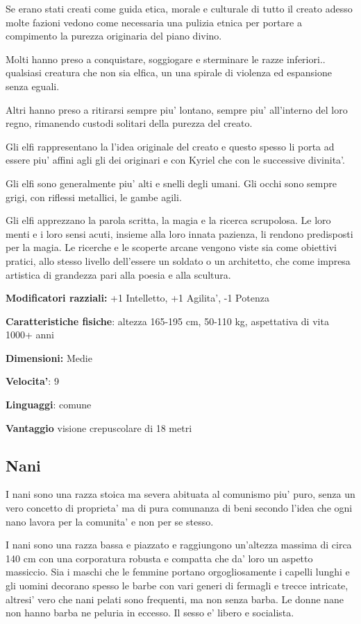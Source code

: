 \documentclass[a4paper,11pt,twoside,openany]{book}
\begin{document}
Se erano stati creati come guida etica, morale e culturale di tutto il creato adesso molte fazioni vedono come necessaria una pulizia etnica per portare a compimento la purezza originaria del piano divino. 

Molti hanno preso a conquistare, soggiogare e sterminare le razze inferiori.. qualsiasi creatura che non sia elfica, un una spirale di violenza ed espansione senza eguali.

Altri hanno preso a ritirarsi sempre piu' lontano, sempre piu' all'interno del loro regno, rimanendo custodi solitari della purezza del creato. 

Gli elfi rappresentano la l'idea originale del creato e questo spesso li porta ad essere piu' affini agli gli dei originari e con Kyriel che con le successive divinita'.

Gli elfi sono generalmente piu' alti e snelli degli umani. Gli occhi sono sempre grigi, con riflessi metallici, le gambe agili.

Gli elfi apprezzano la parola scritta, la magia e la ricerca scrupolosa. Le loro menti e i loro sensi acuti, insieme alla loro innata pazienza, li rendono predisposti per la magia. Le ricerche e le scoperte arcane vengono viste sia come obiettivi pratici, allo stesso livello dell'essere un soldato o un architetto, che come impresa artistica di grandezza pari alla poesia e alla scultura.

\textbf{Modificatori razziali:} +1 Intelletto, +1 Agilita', -1 Potenza

\textbf{Caratteristiche fisiche}: altezza 165-195 cm, 50-110 kg, aspettativa
di vita 1000+ anni

\textbf{Dimensioni:} Medie

\textbf{Velocita'}: 9

\textbf{Linguaggi}: comune

\textbf{Vantaggio} visione crepuscolare di 18 metri

\subsection{Nani}

\label{nani}

I nani sono una razza stoica ma severa abituata al comunismo piu' puro, senza un vero concetto di proprieta' ma di pura comunanza di beni secondo l'idea che ogni nano lavora per la comunita' e non per se stesso.

I nani sono una razza bassa e piazzato e raggiungono un'altezza massima di circa 140 cm con una corporatura robusta e compatta che da' loro un aspetto massiccio. Sia i maschi che le femmine portano orgogliosamente i capelli lunghi e gli uomini decorano spesso le barbe con vari generi di fermagli e trecce intricate, altresi' vero che nani pelati sono frequenti, ma non senza barba. Le donne nane non hanno barba ne peluria in eccesso. Il sesso e' libero e socialista.
\end{document}
